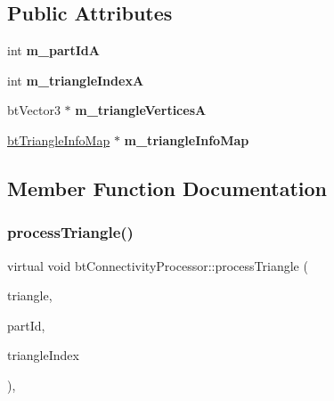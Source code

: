 \subsection*{Public Attributes}
\begin{DoxyCompactItemize}
\item 
\mbox{\label{structbtConnectivityProcessor_aff835524c084797ad3e0757f5728cd9d}} 
int {\bfseries m\+\_\+part\+IdA}
\item 
\mbox{\label{structbtConnectivityProcessor_a5eb429bc81d0605465e89d18c5c79252}} 
int {\bfseries m\+\_\+triangle\+IndexA}
\item 
\mbox{\label{structbtConnectivityProcessor_a4d88edcd11ca7e612bb1c9fd09e15e86}} 
bt\+Vector3 $\ast$ {\bfseries m\+\_\+triangle\+VerticesA}
\item 
\mbox{\label{structbtConnectivityProcessor_a13897d98550b47a15fdfb907fed5c007}} 
\hyperlink{structbtTriangleInfoMap}{bt\+Triangle\+Info\+Map} $\ast$ {\bfseries m\+\_\+triangle\+Info\+Map}
\end{DoxyCompactItemize}


\subsection{Member Function Documentation}
\mbox{\label{structbtConnectivityProcessor_a5d5f11a5ad2bc3b3bfad6882b42e18de}} 
\subsubsection{\texorpdfstring{process\+Triangle()}{processTriangle()}}
{\footnotesize\ttfamily virtual void bt\+Connectivity\+Processor\+::process\+Triangle (\begin{DoxyParamCaption}\item[{bt\+Vector3 $\ast$}]{triangle,  }\item[{int}]{part\+Id,  }\item[{int}]{triangle\+Index }\end{DoxyParamCaption})\hspace{0.3cm}{\ttfamily [inline]}, {\ttfamily [virtual]}}

